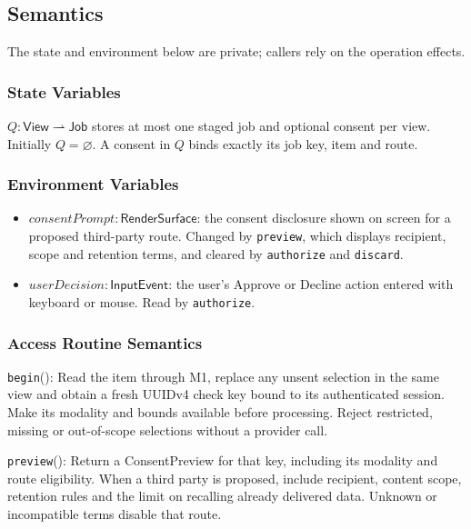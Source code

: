 \documentclass[12pt, titlepage]{article}
\newcommand{\ty}[1]{\textsf{#1}}
\begin{document}
\subsection{Semantics}

The state and environment below are private; callers rely on the operation effects.

\subsubsection{State Variables}

$Q:\ty{View}\rightharpoonup\ty{Job}$ stores at most one staged job and optional consent per view. Initially $Q=\varnothing$. A consent in $Q$ binds exactly its job key, item and route.

\subsubsection{Environment Variables}

\begin{itemize}
\item $\mathit{consentPrompt}:\ty{RenderSurface}$: the consent disclosure shown on screen for a proposed third-party route. Changed by \texttt{preview}, which displays recipient, scope and retention terms, and cleared by \texttt{authorize} and \texttt{discard}.
\item $\mathit{userDecision}:\ty{InputEvent}$: the user's Approve or Decline action entered with keyboard or mouse. Read by \texttt{authorize}.
\end{itemize}

\subsubsection{Access Routine Semantics}

\noindent \texttt{begin}():
Read the item through M1, replace any unsent selection in the same view and obtain a fresh UUIDv4 check key bound to its authenticated session. Make its modality and bounds available before processing. Reject restricted, missing or out-of-scope selections without a provider call.

\medskip\noindent \texttt{preview}():
Return a ConsentPreview for that key, including its modality and route eligibility. When a third party is proposed, include recipient, content scope, retention rules and the limit on recalling already delivered data. Unknown or incompatible terms disable that route.
\end{document}
